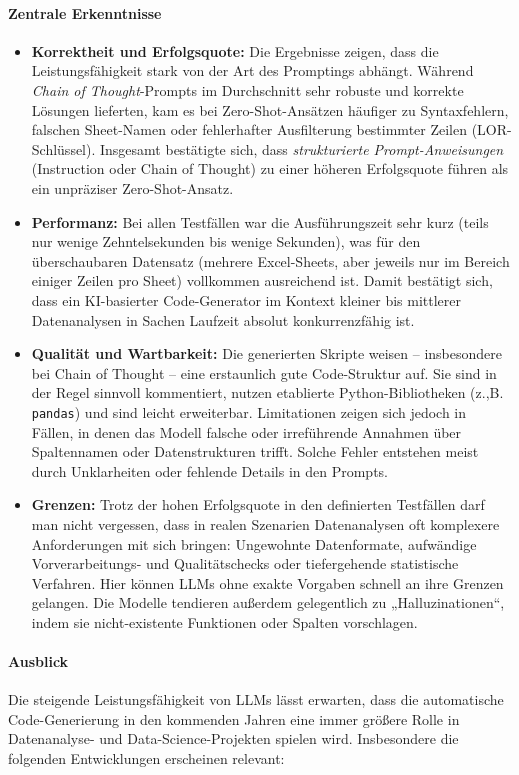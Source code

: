 \documentclass[11pt,a4paper]{article}
\begin{document}
\paragraph{Zentrale Erkenntnisse} \begin{itemize} \item \textbf{Korrektheit und Erfolgsquote:}
Die Ergebnisse zeigen, dass die Leistungsfähigkeit stark von der Art des Promptings abhängt. Während \emph{Chain of Thought}-Prompts im Durchschnitt sehr robuste und korrekte Lösungen lieferten, kam es bei Zero-Shot-Ansätzen häufiger zu Syntaxfehlern, falschen Sheet-Namen oder fehlerhafter Ausfilterung bestimmter Zeilen (LOR-Schlüssel). Insgesamt bestätigte sich, dass \emph{strukturierte Prompt-Anweisungen} (Instruction oder Chain of Thought) zu einer höheren Erfolgsquote führen als ein unpräziser Zero-Shot-Ansatz. \item \textbf{Performanz:}
Bei allen Testfällen war die Ausführungszeit sehr kurz (teils nur wenige Zehntelsekunden bis wenige Sekunden), was für den überschaubaren Datensatz (mehrere Excel-Sheets, aber jeweils nur im Bereich einiger Zeilen pro Sheet) vollkommen ausreichend ist. Damit bestätigt sich, dass ein KI-basierter Code-Generator im Kontext kleiner bis mittlerer Datenanalysen in Sachen Laufzeit absolut konkurrenzfähig ist. \item \textbf{Qualität und Wartbarkeit:}
Die generierten Skripte weisen – insbesondere bei Chain of Thought – eine erstaunlich gute Code-Struktur auf. Sie sind in der Regel sinnvoll kommentiert, nutzen etablierte Python-Bibliotheken (z.,B. \texttt{pandas}) und sind leicht erweiterbar. Limitationen zeigen sich jedoch in Fällen, in denen das Modell falsche oder irreführende Annahmen über Spaltennamen oder Datenstrukturen trifft. Solche Fehler entstehen meist durch Unklarheiten oder fehlende Details in den Prompts. \item \textbf{Grenzen:}
Trotz der hohen Erfolgsquote in den definierten Testfällen darf man nicht vergessen, dass in realen Szenarien Datenanalysen oft komplexere Anforderungen mit sich bringen: Ungewohnte Datenformate, aufwändige Vorverarbeitungs- und Qualitätschecks oder tiefergehende statistische Verfahren. Hier können LLMs ohne exakte Vorgaben schnell an ihre Grenzen gelangen. Die Modelle tendieren außerdem gelegentlich zu „Halluzinationen“, indem sie nicht-existente Funktionen oder Spalten vorschlagen. \end{itemize}

\paragraph{Ausblick} Die steigende Leistungsfähigkeit von LLMs lässt erwarten, dass die automatische Code-Generierung in den kommenden Jahren eine immer größere Rolle in Datenanalyse- und Data-Science-Projekten spielen wird. Insbesondere die folgenden Entwicklungen erscheinen relevant:
\end{document}
